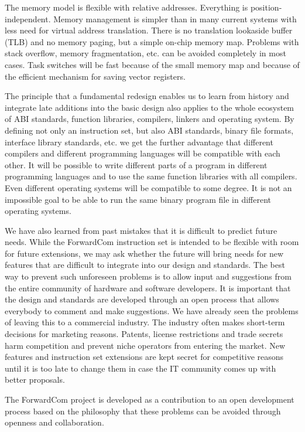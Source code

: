 \documentclass[forwardcom.tex]{subfiles}
\begin{document}
The memory model is flexible with relative addresses. Everything is position-independent. Memory management is simpler than in many current systems with less need for virtual address translation. There is no translation lookaside buffer (TLB) and no memory paging, but a simple on-chip memory map. Problems with stack overflow, memory fragmentation, etc. can be avoided completely in most cases. Task switches will be fast because of the small memory map and because of the efficient mechanism for saving vector registers. 
\vspace{2mm}

The principle that a fundamental redesign enables us to learn from history and integrate late additions into the basic design also applies to the whole ecosystem of ABI standards, function libraries, compilers, linkers and operating system. By defining not only an instruction set, but also ABI standards, binary file formats, interface library standards, etc. we get the further advantage that different compilers and different programming languages will be compatible with each other. It will be possible to write different parts of a program in different programming languages and to use the same function libraries with all compilers. Even different operating systems will be compatible to some degree. It is not an impossible goal to be able to run the same binary program file in different operating systems.
\vspace{2mm}

We have also learned from past mistakes that it is difficult to predict future needs. While the ForwardCom instruction set is intended to be flexible with room for future extensions, we may ask whether the future will bring needs for new features that are difficult to integrate into our design and standards. The best way to prevent such unforeseen problems is to allow input and suggestions from the entire community of hardware and software developers. It is important that the design and standards are developed through an open process that allows everybody to comment and make suggestions. We have already seen the problems of leaving this to a commercial industry. The industry often makes short-term decisions for marketing reasons. Patents, license restrictions and trade secrets harm competition and prevent niche operators from entering the market. New features and instruction set extensions are kept secret for competitive reasons until it is too late to change them in case the IT community comes up with better proposals.
\vspace{2mm}

The ForwardCom project is developed as a contribution to an open development process based on the philosophy that these problems can be avoided through openness and collaboration.
\end{document}
